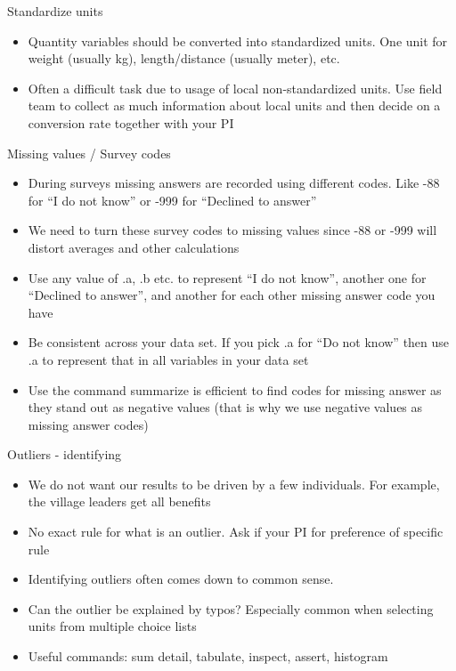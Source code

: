 \documentclass[aspectratio=169]{beamer}
\begin{document}
\begin{frame}{Standardize units }
\begin{itemize}
	\item Quantity variables should be converted into standardized units. One unit for weight (usually kg), length/distance (usually meter), etc. 
	\item Often a difficult task due to usage of local non-standardized units. Use field team to collect as much information about local units and then decide on a conversion rate together with your PI	
\end{itemize}
\end{frame}


\begin{frame}{Missing values / Survey codes}
\begin{itemize}
	\item During surveys missing answers are recorded using different codes. Like -88 for “I do not know” or -999 for “Declined to answer”
	\item We need to turn these survey codes to missing values since -88 or -999 will distort averages and other calculations
	\item Use any value of .a, .b etc. to represent “I do not know”, another one for “Declined to answer”, and another for each other missing answer code you have
	\item Be consistent across your data set. If you pick .a for “Do not know” then use .a to represent that in all variables in your data set
	\item Use the command summarize is efficient to find codes for missing answer as they stand out as negative values (that is why we use negative values as missing answer codes)
\end{itemize}
\end{frame}



\begin{frame}{Outliers - identifying}
\begin{itemize}
	\item We do not want our results to be driven by a few individuals. For example, the village leaders get all benefits
	
	\item No exact rule for what is an outlier.  Ask if your PI for preference of specific rule
	
	\item Identifying outliers often comes down to common sense.
	
	\item Can the outlier be explained by typos? Especially common when selecting units from multiple choice lists
	
	\item Useful commands: sum detail, tabulate, inspect, assert, histogram
	
\end{itemize}
\end{frame}
\end{document}
